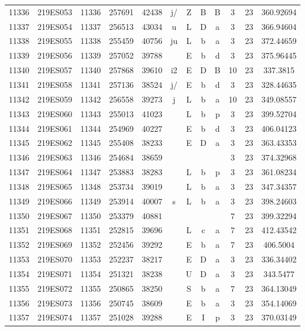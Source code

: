 \begin{tabular}{|*{12}{c|}}
11336 & 219ES053 & 11336 & 257691 & 42438 & j/ & Z & B & B & 3 & 23 & 360.92694 \\ 
11337 & 219ES054 & 11337 & 256513 & 43034 & u & L & D & a & 3 & 23 & 366.94604 \\ 
11338 & 219ES055 & 11338 & 255459 & 40756 & ju & L & b & a & 3 & 23 & 372.44659 \\ 
11339 & 219ES056 & 11339 & 257052 & 39788 &  & E & b & d & 3 & 23 & 375.96445 \\ 
11340 & 219ES057 & 11340 & 257868 & 39610 & i2 & E & D & B & 10 & 23 & 337.3815 \\ 
11341 & 219ES058 & 11341 & 257136 & 38524 & j/ & E & b & d & 3 & 23 & 328.44635 \\ 
11342 & 219ES059 & 11342 & 256558 & 39273 & j & L & b & a & 10 & 23 & 349.08557 \\ 
11343 & 219ES060 & 11343 & 255013 & 41023 &  & L & b & p & 3 & 23 & 399.52704 \\ 
11344 & 219ES061 & 11344 & 254969 & 40227 &  & E & b & d & 3 & 23 & 406.04123 \\ 
11345 & 219ES062 & 11345 & 255408 & 38233 &  & E & D & a & 3 & 23 & 363.43353 \\ 
11346 & 219ES063 & 11346 & 254684 & 38659 &  &  &  &  & 3 & 23 & 374.32968 \\ 
11347 & 219ES064 & 11347 & 253883 & 38283 &  & L & b & p & 3 & 23 & 361.08234 \\ 
11348 & 219ES065 & 11348 & 253734 & 39019 &  & L & b & a & 3 & 23 & 347.34357 \\ 
11349 & 219ES066 & 11349 & 253914 & 40007 & s & L & b & a & 3 & 23 & 398.24603 \\ 
11350 & 219ES067 & 11350 & 253379 & 40881 &  &  &  &  & 7 & 23 & 399.32294 \\ 
11351 & 219ES068 & 11351 & 252815 & 39696 &  & L & c & a & 7 & 23 & 412.43542 \\ 
11352 & 219ES069 & 11352 & 252456 & 39292 &  & E & b & a & 7 & 23 & 406.5004 \\ 
11353 & 219ES070 & 11353 & 252237 & 38217 &  & E & D & a & 3 & 23 & 336.34402 \\ 
11354 & 219ES071 & 11354 & 251321 & 38238 &  & U & D & a & 3 & 23 & 343.5477 \\ 
11355 & 219ES072 & 11355 & 250865 & 38250 &  & S & b & a & 7 & 23 & 364.13049 \\ 
11356 & 219ES073 & 11356 & 250745 & 38609 &  & E & b & a & 3 & 23 & 354.14069 \\ 
11357 & 219ES074 & 11357 & 251028 & 39288 &  & E & I & p & 3 & 23 & 370.03149 \\ 

\end{tabular}
